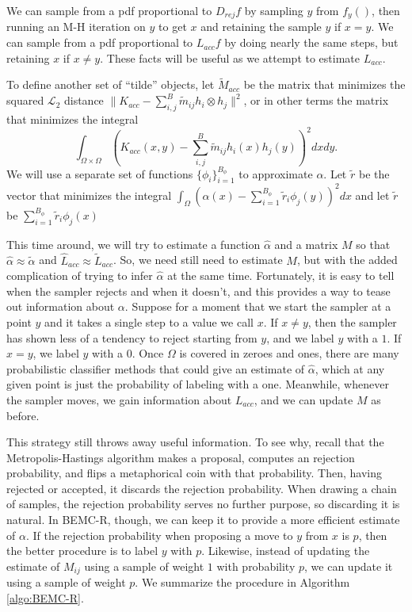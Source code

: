 \documentclass{article}
\newcommand\EMK[1]{\textcolor{purple}{EMK: #1}}
\begin{document}
We can sample from a pdf proportional to $D_{rej}f$ by sampling $y$ from $f_y()$, then running an M-H iteration on $y$ to get $x$ and retaining the sample $y$ if $x = y$. We can sample from a pdf proportional to $L_{acc}f$ by doing nearly the same steps, but retaining $x$ if $x \neq y$. These facts will be useful as we attempt to estimate $L_{acc}$.

To define another set of ``tilde'' objects, let  $\tilde{M}_{acc}$ be the matrix that minimizes the squared $\mathcal{L}_2$ distance $\|K_{acc} - \sum_{i,j}^B\tilde{m}_{ij} h_i \otimes h_j\|^2$, or in other terms the matrix that minimizes the integral $$\int_{\Omega\times\Omega}(K_{acc}(x,y) - \sum_{i,j}^B\tilde{m}_{ij} h_i(x)h_j(y))^2dx dy .$$ We will use a separate set of functions $\{\phi_i\}_{i=1}^{B_\phi}$ to approximate $\alpha$. Let $\tilde{r}$ be the vector that minimizes the integral $\int_{\Omega}(\alpha(x) -  \sum_{i=1}^{B_\phi}\tilde{r}_{i} \phi_j(y))^2dx  $ and let $\tilde{r}$ be $\sum_{i=1}^{B_\phi}\tilde{r}_{i} \phi_j(x)$

This time around, we will try to estimate a function $\hat{\alpha}$ and a matrix $M$ so that $\hat{\alpha}\approx \tilde{\alpha}$ and $\hat{L}_{acc} \approx \tilde{L}_{acc}$.%
 So, we need still need to estimate $M$, but with the added complication of trying to infer $\hat{\alpha}$ at the same time. Fortunately, it is easy to tell when the sampler rejects and when it doesn't, and this provides a way to tease out information about $\alpha$. Suppose for a moment that we start the sampler at a point $y$ and it takes a single step to a value we call $x$. If $x\neq y$, then the sampler has shown less of a tendency to reject starting from $y$, and we label $y$ with a $1$. If $x = y$, we label $y$ with a $0$. Once $\Omega$ is covered in zeroes and ones, there are many probabilistic classifier methods that could give an estimate of $\hat{\alpha}$, which at any given point is just the probability of labeling with a one. Meanwhile, whenever the sampler moves, we gain information about $L_{acc}$, and we can update $M$ as before. 

This strategy still throws away useful information. To see why, recall that the Metropolis-Hastings algorithm makes a proposal, computes an rejection probability, and flips a metaphorical coin with that probability. Then, having rejected or accepted, it discards the rejection probability. When drawing a chain of samples, the rejection probability serves no further purpose, so discarding it is natural. In BEMC-R, though, we can keep it to provide a more efficient estimate of $\alpha$. If the rejection probability when proposing a move to $y$ from $x$ is $p$, then the better procedure is to label $y$ with $p$. Likewise, instead of updating the estimate of $M_{ij}$ using a sample of weight $1$ with probability $p$, we can update it using a sample of weight $p$. We summarize the procedure in Algorithm \ref{algo:BEMC-R}.
\end{document}
